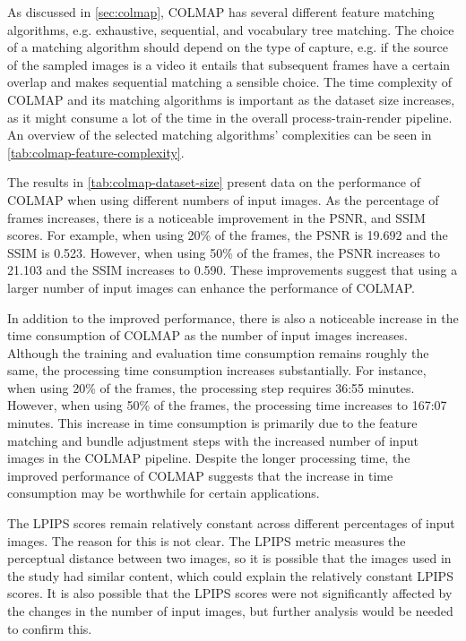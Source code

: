 As discussed in \autoref{sec:colmap}, COLMAP has several different feature matching algorithms, e.g. exhaustive, sequential, and vocabulary tree matching. The choice of a matching algorithm should depend on the type of capture, e.g. if the source of the sampled images is a video it entails that subsequent frames have a certain overlap and makes sequential matching a sensible choice. The time complexity of COLMAP and its matching algorithms is important as the dataset size increases, as it might consume a lot of the time in the overall process-train-render pipeline. An overview of the selected matching algorithms' complexities can be seen in \autoref{tab:colmap-feature-complexity}.

The results in \autoref{tab:colmap-dataset-size} present data on the performance of COLMAP when using different numbers of input images. As the percentage of frames increases, there is a noticeable improvement in the PSNR, and SSIM scores. For example, when using 20\% of the frames, the PSNR is 19.692 and the SSIM is 0.523. However, when using 50\% of the frames, the PSNR increases to 21.103 and the SSIM increases to 0.590. These improvements suggest that using a larger number of input images can enhance the performance of COLMAP.

In addition to the improved performance, there is also a noticeable increase in the time consumption of COLMAP as the number of input images increases. Although the training and evaluation time consumption remains roughly the same, the processing time consumption increases substantially. For instance, when using 20\% of the frames, the processing step requires 36:55 minutes. However, when using 50\% of the frames, the processing time increases to 167:07 minutes. This increase in time consumption is primarily due to the feature matching and bundle adjustment steps with the increased number of input images in the COLMAP pipeline. Despite the longer processing time, the improved performance of COLMAP suggests that the increase in time consumption may be worthwhile for certain applications.

The LPIPS scores remain relatively constant across different percentages of input images. The reason for this is not clear. The LPIPS metric measures the perceptual distance between two images, so it is possible that the images used in the study had similar content, which could explain the relatively constant LPIPS scores. It is also possible that the LPIPS scores were not significantly affected by the changes in the number of input images, but further analysis would be needed to confirm this.




